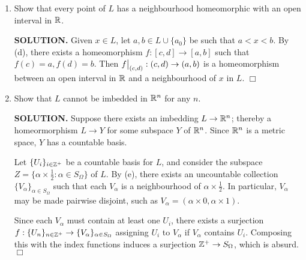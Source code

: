 \documentclass{article}
\begin{document}
\begin{enumerate}
\begin{enumerate}
        \item Show that every point of $L$ has a neighbourhood homeomorphic with an open interval in $\mathbb{R}$.

        {\bf SOLUTION.} Given $x \in L$, let $a, b \in L \cup \{a_0\}$ be such that $a < x < b$. By (d), there exists a homeomorphism $f: [c, d] \rightarrow [a, b]$ such that $f(c) = a, f(d) = b$. Then $\restr{f}{(c, d)}: (c, d) \rightarrow (a, b)$ is a homeomorphism between an open interval in $\mathbb{R}$ and a neighbourhood of $x$ in $L$. $\Box$
        
        \item Show that $L$ cannot be imbedded in $\mathbb{R}^n$ for any $n$.

        {\bf SOLUTION.} Suppose there exists an imbedding $L \rightarrow \mathbb{R}^n$; thereby a homeormorphism $L \rightarrow Y$ for some subspace $Y$ of $\mathbb{R}^n$. Since $\mathbb{R}^n$ is a metric space, $Y$ has a countable basis.

        Let $\{U_i\}_{i \in \mathbb{Z}^+}$ be a countable basis for $L$, and consider the subspace $Z = \{\alpha \times \frac12: \alpha \in S_\Omega\}$ of $L$. By (e), there exists an uncountable collection $\{V_\alpha\}_{\alpha \in S_\Omega}$ such that each $V_\alpha$ is a neighbourhood of $\alpha \times \frac12$. In particular, $V_\alpha$ may be made pairwise disjoint, such as $V_\alpha = (\alpha \times 0, \alpha \times 1)$.
        
        Since each $V_\alpha$ must contain at least one $U_i$, there exists a surjection $f: \{U_n\}_{n \in \mathbb{Z}^+} \rightarrow \{V_\alpha\}_{\alpha \in S_\Omega}$ assigning $U_i$ to $V_\alpha$ if $V_\alpha$ contains $U_i$. Composing this with the index functions induces a surjection $\mathbb{Z}^+ \rightarrow S_\Omega$, which is absurd. $\Box$
    \end{enumerate}
\end{enumerate}
\end{document}
